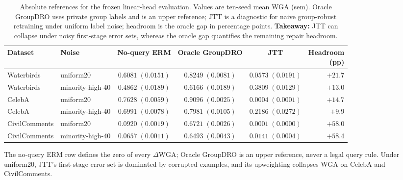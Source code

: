 \documentclass{article}
\newcommand{\dwga}{\ensuremath{\Delta\mathrm{WGA}}}
\begin{document}
\begin{table}[H]
\caption{Absolute references for the frozen linear-head evaluation. Values are ten-seed mean WGA (sem). Oracle GroupDRO uses private group labels and is an upper reference; JTT is a diagnostic for naive group-robust retraining under uniform label noise; headroom is the oracle gap in percentage points. \textbf{Takeaway:} JTT can collapse under noisy first-stage error sets, whereas the oracle gap quantifies the remaining repair headroom.}
\label{tab:absolute}
\centering
\scriptsize
\setlength{\tabcolsep}{1.8pt}
\begin{tabular}{llcccr}
\toprule
Dataset & Noise & No-query ERM & Oracle GroupDRO & JTT & \shortstack{Headroom\\(pp)} \\
\midrule
Waterbirds & uniform20 & $0.6081\;(0.0151)$ & $0.8249\;(0.0081)$ & $0.0573\;(0.0191)$ & $+21.7$ \\
Waterbirds & minority-high-40 & $0.4862\;(0.0189)$ & $0.6166\;(0.0189)$ & $0.3809\;(0.0129)$ & $+13.0$ \\
CelebA & uniform20 & $0.7628\;(0.0059)$ & $0.9096\;(0.0025)$ & $0.0004\;(0.0001)$ & $+14.7$ \\
CelebA & minority-high-40 & $0.6991\;(0.0078)$ & $0.7981\;(0.0105)$ & $0.2186\;(0.0272)$ & $+9.9$ \\
CivilComments & uniform20 & $0.0920\;(0.0019)$ & $0.6721\;(0.0026)$ & $0.0001\;(0.0000)$ & $+58.0$ \\
CivilComments & minority-high-40 & $0.0657\;(0.0011)$ & $0.6493\;(0.0043)$ & $0.0141\;(0.0004)$ & $+58.4$ \\
\bottomrule
\end{tabular}
\end{table}

The no-query ERM row defines the zero of every \dwga{}; Oracle GroupDRO is an
upper reference, never a legal query rule. Under uniform20, JTT's first-stage
error set is dominated by corrupted examples, and its upweighting collapses WGA
on CelebA and CivilComments.
\end{document}
